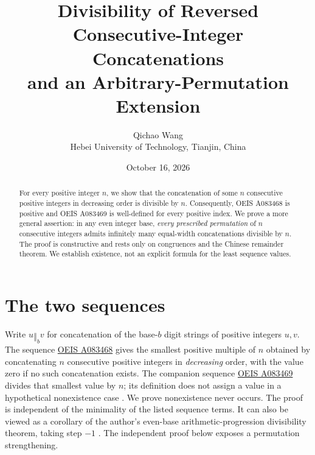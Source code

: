 \documentclass[11pt]{article}
\title{Divisibility of Reversed Consecutive-Integer Concatenations\\and an Arbitrary-Permutation Extension}
\author{Qichao Wang\\\small Hebei University of Technology, Tianjin, China}
\date{October 16, 2026}
\newcommand{\cat}{\mathbin{\Vert}}
\begin{document}
\maketitle
\begin{abstract}
For every positive integer $n$, we show that the concatenation of some
$n$ consecutive positive integers in decreasing order is divisible by $n$.
Consequently, OEIS A083468 is positive and OEIS A083469 is well-defined
for every positive index.  We prove a more general assertion: in any even
integer base, \emph{every prescribed permutation} of $n$ consecutive
integers admits infinitely many equal-width concatenations divisible by
$n$.  The proof is constructive and rests only on congruences and the
Chinese remainder theorem.  We establish existence, not an explicit
formula for the least sequence values.
\end{abstract}
\section{The two sequences}
Write $u\cat_b v$ for concatenation of the base-$b$ digit strings
of positive integers $u,v$.  The sequence
\href{https://oeis.org/A083468}{OEIS A083468} gives the smallest
positive multiple of $n$ obtained by concatenating $n$ consecutive
positive integers in \emph{decreasing} order, with the value zero
if no such concatenation exists.  The companion sequence
\href{https://oeis.org/A083469}{OEIS A083469} divides that
smallest value by $n$; its definition does not assign a value in a
hypothetical nonexistence case \cite{oeis468,oeis469}.
We prove nonexistence never occurs.  The proof is independent of the
minimality of the listed sequence terms.  It can also be viewed as a
corollary of the author's even-base arithmetic-progression divisibility
theorem, taking step $-1$ \cite{wangAP}.  The independent proof below
exposes a permutation strengthening.
\end{document}
